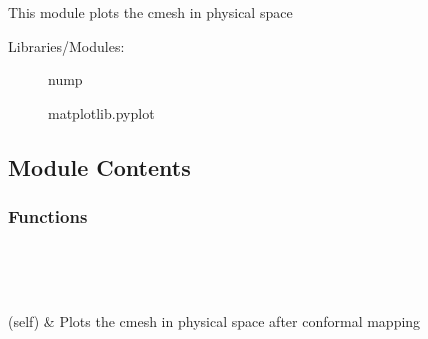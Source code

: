 \documentclass[letterpaper,10pt,english]{sphinxmanual}
\begin{document}
\section{}
\label{\detokenize{autoapi/plot_mesh_func/index:module-plot_mesh_func}}\label{\detokenize{autoapi/plot_mesh_func/index:plot-mesh-func}}\label{\detokenize{autoapi/plot_mesh_func/index::doc}}
\sphinxAtStartPar
This module plots the c\sphinxhyphen{}mesh in physical space
\begin{description}
\item[{Libraries/Modules:}] \leavevmode
\sphinxAtStartPar
nump

\sphinxAtStartPar
matplotlib.pyplot

\end{description}


\subsection{Module Contents}
\label{\detokenize{autoapi/plot_mesh_func/index:module-contents}}

\subsubsection{Functions}
\label{\detokenize{autoapi/plot_mesh_func/index:functions}}

\begin{savenotes}\sphinxatlongtablestart\begin{longtable}[c]{}
\hline

\endfirsthead

%
{}\\
\hline

\endhead

\hline
{}\\
\endfoot

\endlastfoot

\sphinxAtStartPar
{\hyperref[\detokenize{autoapi/plot_mesh_func/index:plot_mesh_func.plot_mesh}]{}}(self)
&
\sphinxAtStartPar
Plots the c\sphinxhyphen{}mesh in physical space after conformal mapping
\\
\hline
\end{longtable}\sphinxatlongtableend\end{savenotes}
\end{document}
